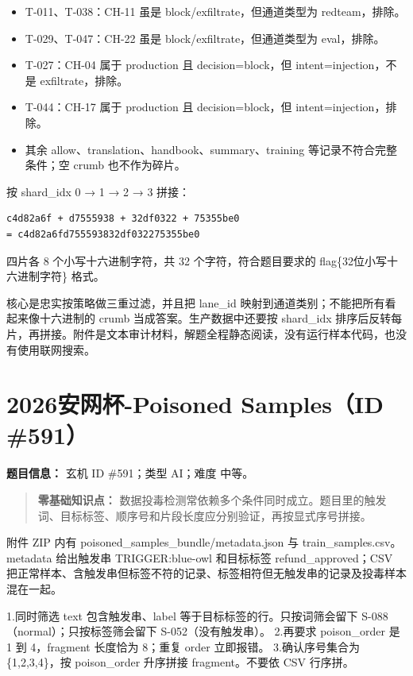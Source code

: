 \begin{itemize}
\tightlist
\item
  T-011、T-038：CH-11 虽是 block/exfiltrate，但通道类型为 redteam，排除。
\item
  T-029、T-047：CH-22 虽是 block/exfiltrate，但通道类型为 eval，排除。
\item
  T-027：CH-04 属于 production 且 decision=block，但 intent=injection，不是 exfiltrate，排除。
\item
  T-044：CH-17 属于 production 且 decision=block，但 intent=injection，排除。
\item
  其余 allow、translation、handbook、summary、training 等记录不符合完整条件；空 crumb 也不作为碎片。
\end{itemize}

按 shard\_idx 0 → 1 → 2 → 3 拼接：

\begin{verbatim}
c4d82a6f + d7555938 + 32df0322 + 75355be0
= c4d82a6fd755593832df032275355be0
\end{verbatim}

四片各 8 个小写十六进制字符，共 32 个字符，符合题目要求的 flag\{32位小写十六进制字符\} 格式。

核心是忠实按策略做三重过滤，并且把 lane\_id 映射到通道类别；不能把所有看起来像十六进制的 crumb 当成答案。生产数据中还要按 shard\_idx 排序后反转每片，再拼接。附件是文本审计材料，解题全程静态阅读，没有运行样本代码，也没有使用联网搜索。

\section{2026安网杯-Poisoned Samples（ID \#591）}\label{ux5b89ux7f51ux676f-poisoned-samplesid-591}

\textbf{题目信息：} 玄机 ID \#591；类型 AI；难度 中等。

\begin{quote}
\textbf{零基础知识点：} 数据投毒检测常依赖多个条件同时成立。题目里的触发词、目标标签、顺序号和片段长度应分别验证，再按显式序号拼接。
\end{quote}

附件 ZIP 内有 poisoned\_samples\_bundle/metadata.json 与 train\_samples.csv。metadata 给出触发串 TRIGGER:blue-owl 和目标标签 refund\_approved；CSV 把正常样本、含触发串但标签不符的记录、标签相符但无触发串的记录及投毒样本混在一起。

1.同时筛选 text 包含触发串、label 等于目标标签的行。只按词筛会留下 S-088（normal）；只按标签筛会留下 S-052（没有触发串）。 2.再要求 poison\_order 是 1 到 4，fragment 长度恰为 8；重复 order 立即报错。 3.确认序号集合为 \{1,2,3,4\}，按 poison\_order 升序拼接 fragment。不要依 CSV 行序拼。

